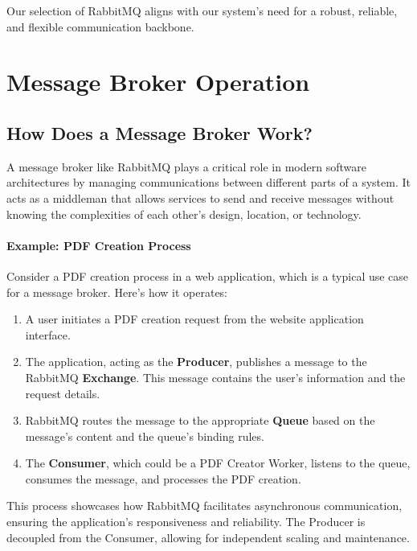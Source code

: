 Our selection of RabbitMQ aligns with our system's need for a robust, reliable, and flexible communication backbone.

\section{Message Broker Operation}

\subsection*{How Does a Message Broker Work?}
A message broker like RabbitMQ plays a critical role in modern software architectures by managing communications between different parts of a system. It acts as a middleman that allows services to send and receive messages without knowing the complexities of each other’s design, location, or technology.

\paragraph*{Example: PDF Creation Process}
Consider a PDF creation process in a web application, which is a typical use case for a message broker. Here’s how it operates:

\begin{enumerate}
    \item A user initiates a PDF creation request from the website application interface.
    \item The application, acting as the \textbf{Producer}, publishes a message to the RabbitMQ \textbf{Exchange}. This message contains the user’s information and the request details.
    \item RabbitMQ routes the message to the appropriate \textbf{Queue} based on the message's content and the queue's binding rules.
    \item The \textbf{Consumer}, which could be a PDF Creator Worker, listens to the queue, consumes the message, and processes the PDF creation.
\end{enumerate}

This process showcases how RabbitMQ facilitates asynchronous communication, ensuring the application’s responsiveness and reliability. The Producer is decoupled from the Consumer, allowing for independent scaling and maintenance.

